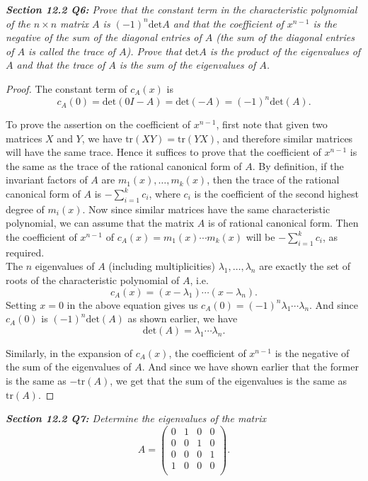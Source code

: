 \documentclass{article}
\begin{document}
\it \textbf{Section 12.2 Q6:} Prove that the constant term in the
  characteristic polynomial of the $n\times n$ matrix $A$ is
  $(-1)^n\text{det}A$ and that the coefficient of $x^{n-1}$ is the negative
  of the sum of the diagonal entries of $A$ (the sum of the diagonal
  entries of $A$ is called the trace of $A$). Prove that $\text{det}A$ is
  the product of the eigenvalues of $A$ and that the trace of $A$ is the
  sum of the eigenvalues of $A$.

  \begin{proof}
    The constant term of $c_A(x)$ is
    \[c_A(0)=\text{det}(0I-A)=\text{det}(-A)=(-1)^n\text{det}(A).\]

    To prove the assertion on the coefficient of $x^{n-1}$, first note that
    given two matrices $X$ and $Y$, we have $\text{tr}(XY)=\text{tr}(YX)$,
    and therefore similar matrices will have the same trace. Hence it
    suffices to prove that the coefficient of $x^{n-1}$ is the same as the
    trace of the rational canonical form of $A$. By definition, if the
    invariant factors of $A$ are $m_1(x),\ldots,m_k(x)$, then the trace of
    the rational canonical form of $A$ is $-\sum_{i=1}^k c_{i}$, where
    $c_{i}$ is the coefficient of the second highest degree of $m_i(x)$.
    Now since similar matrices have the same characteristic polynomial, we
    can assume that the matrix $A$ is of rational canonical form. Then the
    coefficient of $x^{n-1}$ of $c_A(x)=m_1(x)\cdots m_k(x)$ will be
    $-\sum_{i=1}^k c_{i}$, as required. \\

    The $n$ eigenvalues of $A$ (including multiplicities)
    $\lambda_1,\ldots,\lambda_n$ are exactly the set of
    roots of the characteristic polynomial of $A$, i.e.
    \[c_A(x) =(x-\lambda_1)\cdots(x-\lambda_n).\]
    Setting $x=0$ in the above equation gives us
    $c_A(0)=(-1)^n\lambda_1\cdots\lambda_n$. And since $c_A(0)$ is
    $(-1)^n\text{det}(A)$ as shown earlier, we have
    \[\text{det}(A) =\lambda_1\cdots\lambda_n.\]

    Similarly, in the expansion of $c_A(x)$, the coefficient of $x^{n-1}$
    is the negative of the sum of the eigenvalues of $A$. And since we have
    shown earlier that the former is the same as $-\text{tr}(A)$, we get
    that the sum of the eigenvalues is the same as $\text{tr}(A)$.
  \end{proof}

\it \textbf{Section 12.2 Q7:} Determine the eigenvalues of the matrix
  \[A=\begin{pmatrix}
    0&1&0&0\\
    0&0&1&0\\
    0&0&0&1\\
    1&0&0&0\\
  \end{pmatrix}.\]
\end{document}
